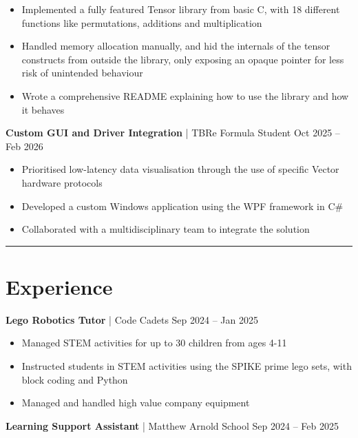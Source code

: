 \documentclass[11pt, a4paper]{article}
\newcommand{\cvline}{\vspace{-4pt}\noindent\rule{\linewidth}{0.5pt}\vspace{-8pt}}
\begin{document}
\begin{itemize}[leftmargin=*, itemsep=-3pt, topsep=2pt]
	\item Implemented a fully featured Tensor library from basic C, with 18 different functions like permutations, additions and multiplication
	\item Handled memory allocation manually, and hid the internals of the tensor constructs from outside the library, only
		exposing an opaque pointer for less risk of unintended behaviour
	\item Wrote a comprehensive README explaining how to use the library and how it behaves
\end{itemize}

\vspace{2pt}
{\large\textbf{Custom GUI and Driver Integration} | TBRe Formula Student \hfill	Oct 2025 – Feb 2026}
\vspace{2pt}

\begin{itemize}[leftmargin=*, itemsep=-3pt, topsep=2pt]
	\item Prioritised low-latency data visualisation through the use of specific Vector hardware protocols
    \item Developed a custom Windows application using the WPF framework in C\#
    \item Collaborated with a multidisciplinary team to integrate the solution 
\end{itemize}

\cvline
\section{Experience}
\vspace{2pt}
{\large \textbf{Lego Robotics Tutor} | Code Cadets	\hfill Sep 2024 – Jan 2025}
\vspace{2pt}

\begin{itemize}[leftmargin=*, itemsep=-3pt, topsep=2pt]
\item Managed STEM activities for up to 30 children from ages 4-11
\item Instructed students in STEM activities using the SPIKE prime lego sets, with block coding and Python
\item Managed and handled high value company equipment
\end{itemize}

\vspace{2pt}
{\large\textbf{Learning Support Assistant} | Matthew Arnold School	\hfill Sep 2024 – Feb 2025}
\vspace{2pt}
\end{document}
